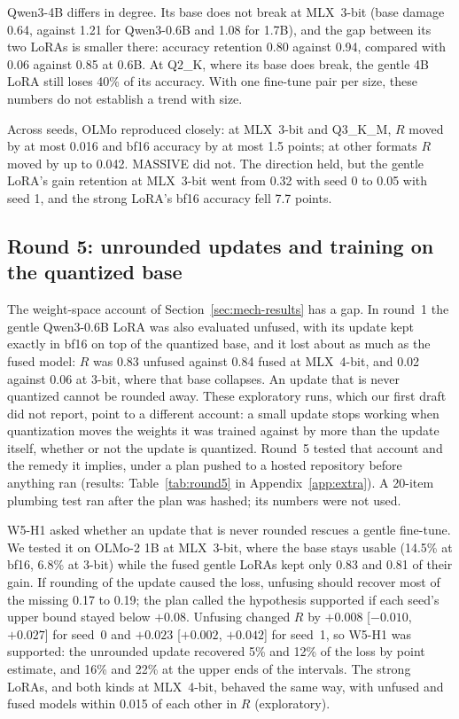 \documentclass[10pt]{article}
\begin{document}
Qwen3-4B differs in degree. Its base does not break at MLX~3-bit (base damage 0.64, against 1.21 for Qwen3-0.6B and 1.08 for 1.7B), and the gap between its two LoRAs is smaller there: accuracy retention 0.80 against 0.94, compared with 0.06 against 0.85 at 0.6B. At Q2\_K, where its base does break, the gentle 4B LoRA still loses 40\% of its accuracy. With one fine-tune pair per size, these numbers do not establish a trend with size.

Across seeds, OLMo reproduced closely: at MLX~3-bit and Q3\_K\_M, $R$ moved by at most 0.016 and bf16 accuracy by at most 1.5 points; at other formats $R$ moved by up to 0.042. MASSIVE did not. The direction held, but the gentle LoRA's gain retention at MLX~3-bit went from 0.32 with seed 0 to 0.05 with seed 1, and the strong LoRA's bf16 accuracy fell 7.7 points.

\subsection{Round 5: unrounded updates and training on the quantized base}
\label{sec:round5}

The weight-space account of Section~\ref{sec:mech-results} has a gap. In round~1 the gentle Qwen3-0.6B LoRA was also evaluated unfused, with its update kept exactly in bf16 on top of the quantized base, and it lost about as much as the fused model: $R$ was 0.83 unfused against 0.84 fused at MLX~4-bit, and 0.02 against 0.06 at 3-bit, where that base collapses. An update that is never quantized cannot be rounded away. These exploratory runs, which our first draft did not report, point to a different account: a small update stops working when quantization moves the weights it was trained against by more than the update itself, whether or not the update is quantized. Round~5 tested that account and the remedy it implies, under a plan pushed to a hosted repository before anything ran (results: Table~\ref{tab:round5} in Appendix~\ref{app:extra}). A 20-item plumbing test ran after the plan was hashed; its numbers were not used.

W5-H1 asked whether an update that is never rounded rescues a gentle fine-tune. We tested it on OLMo-2 1B at MLX~3-bit, where the base stays usable (14.5\% at bf16, 6.8\% at 3-bit) while the fused gentle LoRAs kept only 0.83 and 0.81 of their gain. If rounding of the update caused the loss, unfusing should recover most of the missing 0.17 to 0.19; the plan called the hypothesis supported if each seed's upper bound stayed below $+0.08$. Unfusing changed $R$ by $+0.008$ [$-0.010$, $+0.027$] for seed~0 and $+0.023$ [$+0.002$, $+0.042$] for seed~1, so W5-H1 was supported: the unrounded update recovered 5\% and 12\% of the loss by point estimate, and 16\% and 22\% at the upper ends of the intervals. The strong LoRAs, and both kinds at MLX~4-bit, behaved the same way, with unfused and fused models within 0.015 of each other in $R$ (exploratory).
\end{document}
